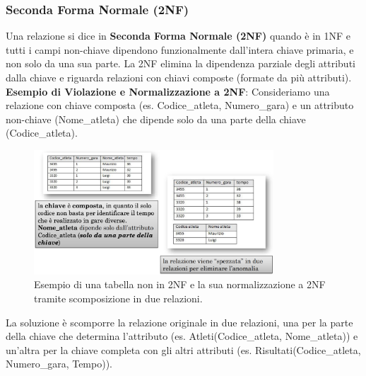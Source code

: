 \subsubsection{Seconda Forma Normale (2NF)}
Una relazione si dice in \textbf{Seconda Forma Normale (2NF)} quando è in 1NF e tutti i campi non-chiave dipendono funzionalmente dall'intera chiave primaria, e non solo da una sua parte. La 2NF elimina la dipendenza parziale degli attributi dalla chiave e riguarda relazioni con chiavi composte (formate da più attributi).
\textbf{Esempio di Violazione e Normalizzazione a 2NF}:
Consideriamo una relazione con chiave composta (es. Codice\_atleta, Numero\_gara) e un attributo non-chiave (Nome\_atleta) che dipende solo da una parte della chiave (Codice\_atleta).
\begin{figure}[h!]
    \centering
    \includegraphics[width=0.8\textwidth]{immagini/nf_2nf_esempio_atleta.png} %
    \caption{Esempio di una tabella non in 2NF e la sua normalizzazione a 2NF tramite scomposizione in due relazioni.}
    \label{fig:nf_2nf_esempio_atleta}
\end{figure}
La soluzione è scomporre la relazione originale in due relazioni, una per la parte della chiave che determina l'attributo (es. Atleti(Codice\_atleta, Nome\_atleta)) e un'altra per la chiave completa con gli altri attributi (es. Risultati(Codice\_atleta, Numero\_gara, Tempo)).

